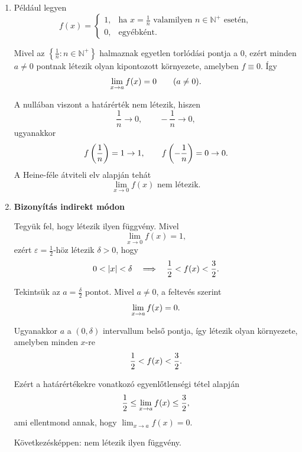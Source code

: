 \documentclass[11pt]{scrartcl}
\begin{document}
\begin{enumerate}
	\item Például legyen
	      \[
		      f(x) = \begin{cases}
			      1, & \text{ha } x = \frac{1}{n}
			      \text{ valamilyen } n \in \mathbb{N}^+
			      \text{ esetén},                 \\
			      0, & \text{egyébként}.
		      \end{cases}
	      \]

	      Mivel az $\left\{\frac{1}{n} : n \in \mathbb{N}^+\right\}$
	      halmaznak egyetlen torlódási pontja a $0$, ezért
	      minden $a \neq 0$ pontnak létezik olyan kipontozott
	      környezete, amelyben $f \equiv 0$. Így
	      \[
		      \lim_{x \to a} f(x) = 0
		      \qquad (a \neq 0)
		      \text.
	      \]

	      A nullában viszont a határérték nem létezik,
	      hiszen
	      \[
		      \frac{1}{n} \to 0,
		      \qquad
		      -\frac{1}{n} \to 0,
	      \]
	      ugyanakkor
	      \[
		      f\left(\frac{1}{n}\right) = 1 \to 1,
		      \qquad
		      f\left(-\frac{1}{n}\right) = 0 \to 0
		      \text.
	      \]
	      A Heine-féle átviteli elv alapján tehát
	      \[
		      \lim_{x \to 0} f(x) \text{ nem létezik.}
	      \]

	\item \textbf{Bizonyítás indirekt módon}

	      Tegyük fel, hogy létezik ilyen függvény.
	      Mivel
	      \[
		      \lim_{x \to 0} f(x) = 1,
	      \]
	      ezért $\varepsilon = \frac{1}{2}$-höz létezik
	      $\delta > 0$, hogy
	      \[
		      0 < |x| < \delta
		      \quad \Longrightarrow \quad
		      \frac{1}{2} < f(x) < \frac{3}{2}
		      \text.
	      \]

	      Tekintsük az $a = \frac{\delta}{2}$ pontot.
	      Mivel $a \neq 0$, a feltevés szerint
	      \[
		      \lim_{x \to a} f(x) = 0
		      \text.
	      \]

	      Ugyanakkor $a$ a $(0,\delta)$ intervallum
	      belső pontja, így létezik olyan környezete,
	      amelyben minden $x$-re
	      \[
		      \frac{1}{2} < f(x) < \frac{3}{2}
		      \text.
	      \]

	      Ezért a határértékekre vonatkozó
	      egyenlőtlenségi tétel alapján
	      \[
		      \frac{1}{2}
		      \leq \lim_{x \to a} f(x)
		      \leq \frac{3}{2}
		      \text,
	      \]
	      ami ellentmond annak, hogy
	      $\displaystyle\lim_{x \to a} f(x) = 0$.

	      Következésképpen: nem létezik ilyen függvény.
\end{enumerate}
\end{document}
